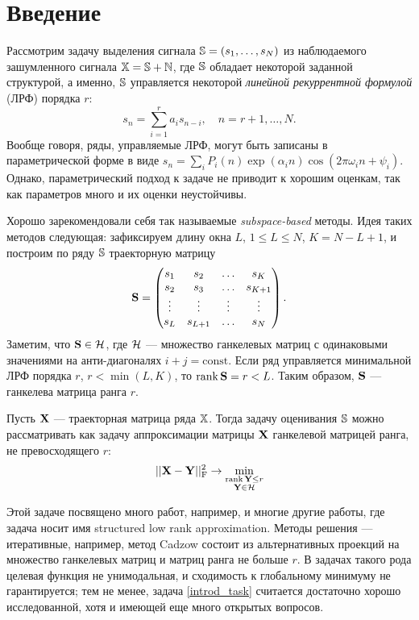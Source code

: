 \documentclass[12pt,a4paper,fleqn,leqno]{article}
\def\rank{\mathop{\mathrm{rank}}}
\begin{document}
\section{Введение}
Рассмотрим задачу выделения сигнала $\mathbb{S} = (s_1, \ldots, s_N)$ из наблюдаемого зашумленного сигнала $\mathbb{X} = \mathbb{S} + \mathbb{N}$, где $\mathbb{S}$  обладает некоторой заданной структурой, а именно, $\mathbb{S}$ управляется некоторой \emph{линейной рекуррентной формулой} (ЛРФ) порядка $r$:
\begin{equation*}
s_n = \sum_{i = 1}^{r} a_i s_{n-i}, \quad n = r + 1, \ldots, N.
\end{equation*}
Вообще говоря, ряды, управляемые ЛРФ, могут быть записаны в параметрической форме в виде $s_n = \sum_i P_i(n) \exp(\alpha_i n) \cos(2 \pi \omega_i n + \psi_i)$. Однако, параметрический подход к задаче не приводит к хорошим оценкам, так как параметров много и их оценки неустойчивы.

Хорошо зарекомендовали себя так называемые \emph{subspace-based} методы. Идея таких методов следующая: зафиксируем длину окна $L$, $1 \le L \le N$, $K = N - L + 1$, и построим по ряду $\mathbb{S}$ траекторную матрицу
\begin{equation*}
\mathbf{S} = \begin{pmatrix}
s_1 & s_2 & \ldots & s_K \\
s_2 & s_3 & \ldots & s_{K + 1} \\
\vdots & \vdots & \vdots & \vdots \\
s_L & s_{L + 1} & \ldots & s_N
\end{pmatrix}.
\end{equation*}
Заметим, что $\mathbf{S}\in \mathcal{H}$, где $\mathcal{H}$ --- множество ганкелевых матриц с одинаковыми значениями на анти-диагоналях $i+j=\mathrm{const}$.
Если ряд управляется минимальной ЛРФ порядка $r$, $r < \min(L, K)$, то $\rank \bfS = r < L$. Таким образом, $\mathbf{S}$ --- ганкелева матрица ранга $r$.

Пусть $\mathbf{X}$ --- траекторная матрица ряда $\mathbb{X}$. Тогда задачу оценивания $\mathbb{S}$ можно рассматривать как задачу аппроксимации матрицы $\mathbf{X}$ ганкелевой матрицей ранга, не превосходящего $r$:
\begin{equation}\label{introd_task}
||\bfX - \bfY||^2_\rmF \to \min_{\substack{\rank \bfY \le r \\ \bfY \in \calH}}
\end{equation}

Этой задаче посвящено много работ, например, \cite{Cadzow1988, Markovsky2011, Usevich.Markovsky2014, Gillard2014} и многие другие работы, где задача носит имя
structured low rank approximation. Методы решения --- итеративные, например, метод Cadzow состоит из альтернативных проекций на множество ганкелевых матриц и матриц ранга не больше $r$. В задачах такого рода целевая функция не унимодальная, и сходимость к глобальному минимуму не гарантируется; тем не менее, задача \eqref{introd_task} считается достаточно хорошо исследованной, хотя и имеющей еще много открытых вопросов.
\end{document}
